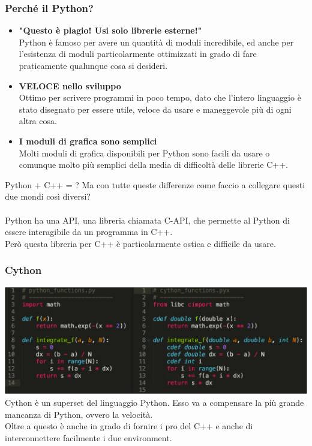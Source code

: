 \documentclass[11pt]{beamer}
\begin{document}
\begin{frame}
\frametitle{Perché il Python?}
\begin{itemize}
	\pause
	\item \textbf{"Questo è plagio! Usi solo librerie esterne!"}\\
	Python è famoso per avere un quantità di moduli incredibile\footnotemark, ed anche per l'esistenza di moduli particolarmente ottimizzati in grado di fare praticamente qualunque cosa si desideri.
	\pause
	\item \textbf{VELOCE nello sviluppo} \\
	Ottimo per scrivere programmi in poco tempo, dato che l'intero linguaggio è stato disegnato per essere utile, veloce da usare e maneggevole più di ogni altra cosa.
	\pause
	\item \textbf{I moduli di grafica sono semplici} \\
	Molti moduli di grafica disponibili per Python sono facili da usare o comunque molto più semplici della media di difficoltà delle librerie C++.
\end{itemize}
\end{frame}

\begin{frame}{Python + C++ = ?}
Ma con tutte queste differenze come faccio a collegare questi due mondi così diversi?\\\\
\pause
Python ha una API, una libreria chiamata C-API, che permette al Python di essere interagibile da un programma in C++.\\
Però questa libreria per C++ è particolarmente ostica e difficile da usare.
\end{frame}

\begin{frame}
\frametitle{Cython}
\includegraphics[width=\linewidth]{cython-code.png}
Cython è un superset del linguaggio Python. Esso va a compensare la più grande mancanza di Python, ovvero la velocità. \\
Oltre a questo è anche in grado di fornire i pro del C++ e anche di interconnettere facilmente i due environment.
\end{frame}
\end{document}
